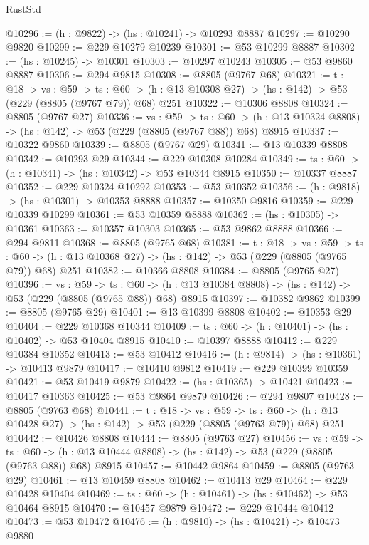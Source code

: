 \begin{lexlean}{RustStd}
\begin{coremodule}
@10296 := (h : @9822) -> (hs : @10241) -> @10293 @8887
@10297 := @10290 @9820
@10299 := @229 @10279 @10239
@10301 := @53 @10299 @8887
@10302 := (hs : @10245) -> @10301
@10303 := @10297 @10243
@10305 := @53 @9860 @8887
@10306 := @294 @9815
@10308 := @8805 (@9767 @68)
@10321 := {t : @18} ->
  {vs : @59} ->
  {ts : @60} -> (h : @13 @10308 @27) -> (hs : @142) -> @53 (@229 (@8805 (@9767 @79)) @68) @251
@10322 := @10306 @8808
@10324 := @8805 (@9767 @27)
@10336 := {vs : @59} ->
  {ts : @60} -> (h : @13 @10324 @8808) -> (hs : @142) -> @53 (@229 (@8805 (@9767 @88)) @68) @8915
@10337 := @10322 @9860
@10339 := @8805 (@9767 @29)
@10341 := @13 @10339 @8808
@10342 := @10293 @29
@10344 := @229 @10308 @10284
@10349 := {ts : @60} -> (h : @10341) -> (hs : @10342) -> @53 @10344 @8915
@10350 := @10337 @8887
@10352 := @229 @10324 @10292
@10353 := @53 @10352
@10356 := (h : @9818) -> (hs : @10301) -> @10353 @8888
@10357 := @10350 @9816
@10359 := @229 @10339 @10299
@10361 := @53 @10359 @8888
@10362 := (hs : @10305) -> @10361
@10363 := @10357 @10303
@10365 := @53 @9862 @8888
@10366 := @294 @9811
@10368 := @8805 (@9765 @68)
@10381 := {t : @18} ->
  {vs : @59} ->
  {ts : @60} -> (h : @13 @10368 @27) -> (hs : @142) -> @53 (@229 (@8805 (@9765 @79)) @68) @251
@10382 := @10366 @8808
@10384 := @8805 (@9765 @27)
@10396 := {vs : @59} ->
  {ts : @60} -> (h : @13 @10384 @8808) -> (hs : @142) -> @53 (@229 (@8805 (@9765 @88)) @68) @8915
@10397 := @10382 @9862
@10399 := @8805 (@9765 @29)
@10401 := @13 @10399 @8808
@10402 := @10353 @29
@10404 := @229 @10368 @10344
@10409 := {ts : @60} -> (h : @10401) -> (hs : @10402) -> @53 @10404 @8915
@10410 := @10397 @8888
@10412 := @229 @10384 @10352
@10413 := @53 @10412
@10416 := (h : @9814) -> (hs : @10361) -> @10413 @9879
@10417 := @10410 @9812
@10419 := @229 @10399 @10359
@10421 := @53 @10419 @9879
@10422 := (hs : @10365) -> @10421
@10423 := @10417 @10363
@10425 := @53 @9864 @9879
@10426 := @294 @9807
@10428 := @8805 (@9763 @68)
@10441 := {t : @18} ->
  {vs : @59} ->
  {ts : @60} -> (h : @13 @10428 @27) -> (hs : @142) -> @53 (@229 (@8805 (@9763 @79)) @68) @251
@10442 := @10426 @8808
@10444 := @8805 (@9763 @27)
@10456 := {vs : @59} ->
  {ts : @60} -> (h : @13 @10444 @8808) -> (hs : @142) -> @53 (@229 (@8805 (@9763 @88)) @68) @8915
@10457 := @10442 @9864
@10459 := @8805 (@9763 @29)
@10461 := @13 @10459 @8808
@10462 := @10413 @29
@10464 := @229 @10428 @10404
@10469 := {ts : @60} -> (h : @10461) -> (hs : @10462) -> @53 @10464 @8915
@10470 := @10457 @9879
@10472 := @229 @10444 @10412
@10473 := @53 @10472
@10476 := (h : @9810) -> (hs : @10421) -> @10473 @9880

\end{coremodule}
\end{lexlean}
